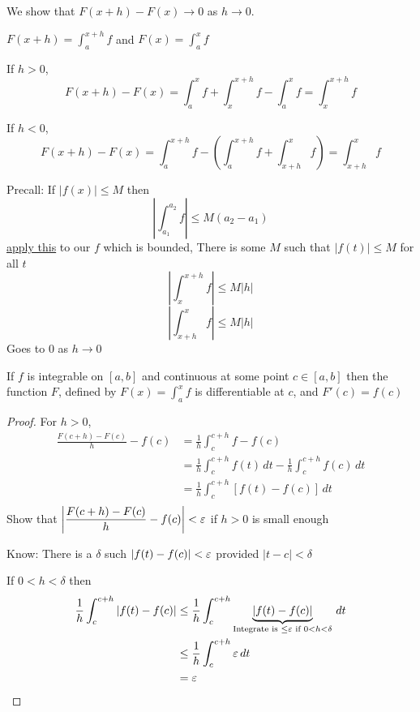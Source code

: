 We show that $F(x+h) - F(x) \to 0$ as $h \to 0$.

$\displaystyle F(x+h) = \int_a^{x+h} f$ and 
$\displaystyle F(x) = \int_a^{x} f$

If $h > 0$, $$\displaystyle F(x+h) - F(x) = \int_a^x f + \int_x^{x+h} f - \int_a^x f = \int_x^{x+h} f$$

If $h < 0$, $$\displaystyle F(x+h) - F(x) = \int_a^{x+h} f -\left( \int_a^{x+h} f + \int_{x+h}^x f\right) = \int_{x+h}^{x} f$$

Precall: If $|f(x)| \le M$ then 
\[\left|\int_{a_1}^{a_2} f\right| \le M(a_2 - a_1)\]
\underline{apply this} to our $f$ which is bounded, There is some  $M$ such that $|f(t)| \le M$ for all $t$
\[\left|\int_{x}^{x+h} f\right| \le M|h|\]
\[\left|\int_{x+h}^{x} f\right| \le M|h|\]
Goes to $0$ as $h \to 0$

\begin{theorem*}
  If $f$ is integrable on $[a, b]$ and continuous at some point $c \in [a, b]$ then the function
  $F$, defined by $\displaystyle F(x) = \int_a^x f$ is differentiable at $c$, and $F'(c) = f(c)$ 
\end{theorem*}

\begin{proof}
  For $h > 0$,
  \begin{align*}
    \frac{F(c+h)-F(c)}{h} - f(c) &= \frac{1}{h}\int_c^{c+h} f - f(c) \\
    &= \frac{1}{h} \int_c^{c+h} f(t) \,dt - \frac{1}{h}\int_c^{c+h} f(c)\,dt \\
    &= \frac{1}{h} \int_c^{c+h}[f(t) - f(c)]\,dt \\
  \end{align*}
  Show that $\displaystyle \left|\frac{F(c+h) - F(c)}{h} - f(c)\right| < \varepsilon$ if $h>0$ is small enough

  Know: There is a $\delta$ such $|f(t) - f(c)| < \varepsilon$ provided $|t-c| < \delta$

  If $0  < h < \delta$ then 
  \begin{align*}
    \frac{1}{h} \int_c^{c+h} |f(t) - f(c)| &\le\frac{1}{h} \int_c^{c+h} \underbrace{|f(t)-f(c)|}_{\text{Integrate is } \le \varepsilon \text{ if } 0 < h < \delta}\,dt \\ 
    &\le \frac{1}{h} \int_c^{c+h} \varepsilon \,dt \\
    &= \varepsilon
  \end{align*}
\end{proof}

